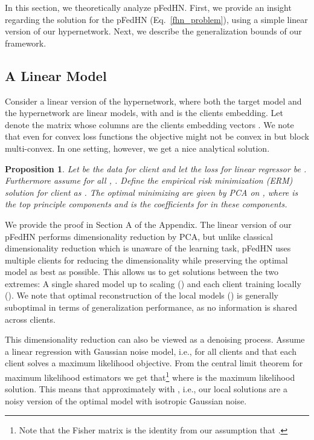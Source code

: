 \documentclass{article}
\newtheorem{prop}{Proposition}
\newcommand\ourmethod{pFedHN}
\begin{document}
In this section, we theoretically analyze \ourmethod{}. First, we provide an insight regarding the solution for the  \ourmethod{} (Eq.~\ref{fhn_problem}), using a simple linear version of our hypernetwork. Next, we describe the generalization bounds of our framework.



\subsection{A Linear Model}

Consider a linear version of the hypernetwork, where both the target model and the hypernetwork are linear models,  with  and  is the  clients embedding. Let  denote the  matrix whose columns are the clients embedding vectors . We note that even for convex loss functions  the objective  might not be convex in  but block multi-convex. In one setting, however, we get a nice analytical solution.

\begin{prop}
Let  be the data for client  and let the loss for linear regressor  be . Furthermore assume for all , . Define the empirical risk minimization (ERM) solution for client  as  . The optimal  minimizing  are given by PCA on , where  is the top  principle components and  is the coefficients for  in these components.
\end{prop}

We provide the proof in Section A of the Appendix. The linear version of our \ourmethod{} performs dimensionality reduction by PCA, but unlike classical dimensionality reduction which is unaware of the learning task, \ourmethod{} uses multiple clients for reducing the dimensionality while preserving the optimal model as best as possible. This allows us to get solutions between the two extremes: A single shared model up to scaling () and each client training locally (). We note that optimal reconstruction of the local models () is generally suboptimal in terms of generalization performance, as no information is shared across clients.

This dimensionality reduction can also be viewed as a denoising process. Assume a linear regression with Gaussian noise model, i.e., for all clients   and that each client solves a maximum likelihood objective. From the central limit theorem for maximum likelihood estimators \cite{CLT_for_ML} we get that\footnote{Note that the Fisher matrix is the identity from our assumption that .}  where  is the maximum likelihood solution. This means that approximately  with  , i.e., our local solutions  are a noisy version of the optimal model  with isotropic Gaussian noise.  
\end{document}
